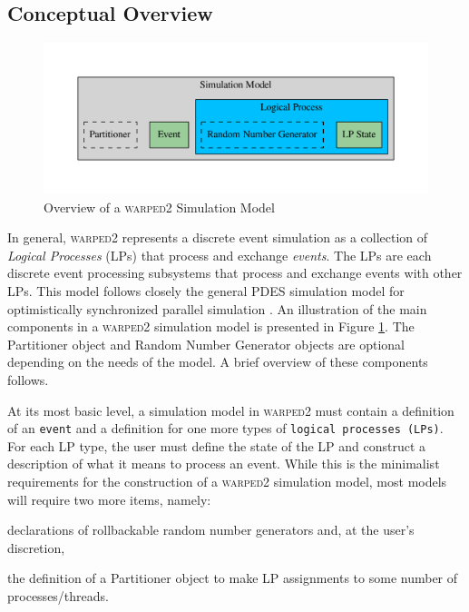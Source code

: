 \documentclass[11pt]{book}
\begin{document}
\subsection{Conceptual Overview}

\begin{figure}
    \centering
    \includegraphics[width=\textwidth,quiet]{figs/graphviz/model.pdf}
    \caption{Overview of a \textsc{warped2} Simulation Model}\label{warped2_conceptual_overview}
\end{figure}

In general, \textsc{warped2} represents a discrete event simulation as a collection of \emph{Logical
  Processes} (LPs) that process and exchange \emph{events}.  The LPs are each discrete event
processing subsystems that process and exchange events with other LPs.  This model follows closely
the general PDES simulation model for optimistically synchronized parallel simulation
\cite{fujimoto-90,jefferson-85}.  An illustration of the main components in a \textsc{warped2}
simulation model is presented in Figure \ref{warped2_conceptual_overview}.  The Partitioner object
and Random Number Generator objects are optional depending on the needs of the model.  A brief
overview of these components follows.

At its most basic level, a simulation model in \textsc{warped2} must contain a definition of an
\texttt{event} and a definition for one more types of \texttt{logical processes (LPs)}.  For
each LP type, the user must define the state of the LP and construct a description of what it
means to process an event.  While this is the minimalist requirements for the construction of
a \textsc{warped2} simulation model, most models will require two more items, namely:
\begin{inparaenum}[(1)] \item declarations of rollbackable random number generators and,
at the user's discretion, \item the definition of a Partitioner object to make LP assignments
to some number of processes/threads.\end{inparaenum}
\end{document}
